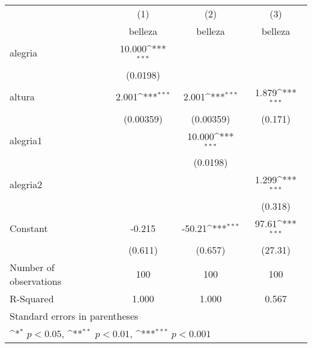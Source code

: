 {
\def\sym#1{\ifmmode^{#1}\else\(^{#1}\)\fi}
\begin{tabular}{l*{3}{c}}
\hline\hline
                    &\multicolumn{1}{c}{(1)}&\multicolumn{1}{c}{(2)}&\multicolumn{1}{c}{(3)}\\
                    &\multicolumn{1}{c}{belleza}&\multicolumn{1}{c}{belleza}&\multicolumn{1}{c}{belleza}\\
\hline
alegria             &      10.000\sym{***}&                     &                     \\
                    &    (0.0198)         &                     &                     \\
[1em]
altura              &       2.001\sym{***}&       2.001\sym{***}&       1.879\sym{***}\\
                    &   (0.00359)         &   (0.00359)         &     (0.171)         \\
[1em]
alegria1            &                     &      10.000\sym{***}&                     \\
                    &                     &    (0.0198)         &                     \\
[1em]
alegria2            &                     &                     &       1.299\sym{***}\\
                    &                     &                     &     (0.318)         \\
[1em]
Constant            &      -0.215         &      -50.21\sym{***}&       97.61\sym{***}\\
                    &     (0.611)         &     (0.657)         &     (27.31)         \\
\hline
Number of observations&         100         &         100         &         100         \\
R-Squared           &       1.000         &       1.000         &       0.567         \\
\hline\hline
\multicolumn{4}{l}{\footnotesize Standard errors in parentheses}\\
\multicolumn{4}{l}{\footnotesize \sym{*} \(p<0.05\), \sym{**} \(p<0.01\), \sym{***} \(p<0.001\)}\\
\end{tabular}
}
